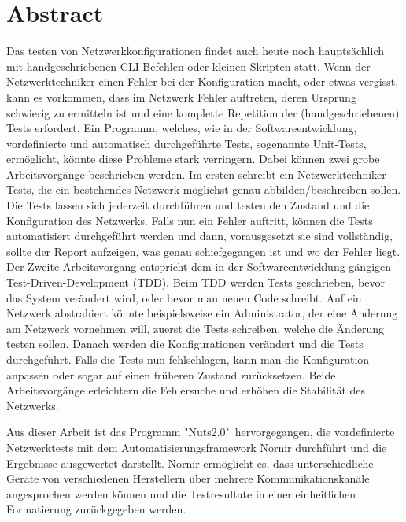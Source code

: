 \documentclass[]{subfiles}
\begin{document}
\section*{Abstract}
    Das testen von Netzwerkkonfigurationen findet auch heute noch hauptsächlich 
    mit handgeschriebenen CLI-Befehlen oder kleinen Skripten statt. 
    Wenn der Netzwerktechniker einen Fehler bei der Konfiguration macht, 
    oder etwas vergisst, kann es vorkommen, dass im Netzwerk Fehler auftreten, 
    deren Ursprung schwierig zu ermitteln ist und eine komplette Repetition der 
    (handgeschriebenen) Tests erfordert.
    Ein Programm, welches, wie in der Softwareentwicklung, vordefinierte und automatisch 
    durchgeführte Tests, sogenannte Unit-Tests, ermöglicht, könnte diese Probleme stark
    verringern. Dabei können zwei grobe Arbeitsvorgänge beschrieben werden. 
    Im ersten schreibt ein Netzwerktechniker Tests, die ein bestehendes Netzwerk 
    möglichst genau abbilden/beschreiben sollen. 
    Die Tests lassen sich jederzeit durchführen und testen den Zustand und die 
    Konfiguration des Netzwerks. 
    Falls nun ein Fehler auftritt, können die Tests automatisiert durchgeführt 
    werden und dann, vorausgesetzt sie sind vollständig, sollte der Report aufzeigen, 
    was genau schiefgegangen ist und wo der Fehler liegt. 
    Der Zweite Arbeitsvorgang entspricht dem in der Softwareentwicklung gängigen 
    Test-Driven-Development (TDD). 
    Beim TDD werden Tests geschrieben, bevor das System verändert wird, oder bevor 
    man neuen Code schreibt. 
    Auf ein Netzwerk abstrahiert könnte beispielsweise ein Administrator, der 
    eine Änderung am Netzwerk vornehmen will, zuerst die Tests schreiben, 
    welche die Änderung testen sollen. 
    Danach werden die Konfigurationen verändert und die Tests durchgeführt. 
    Falls die Tests nun fehlschlagen, kann man die Konfiguration anpassen oder 
    sogar auf einen früheren Zustand zurücksetzen. 
    Beide Arbeitsvorgänge erleichtern die Fehlersuche und erhöhen die Stabilität des Netzwerks.

    Aus dieser Arbeit ist das Programm "Nuts2.0"\, hervorgegangen, die vordefinierte
    Netzwerktests mit dem Automatisierungsframework Nornir durchführt und die 
    Ergebnisse ausgewertet darstellt. 
    Nornir ermöglicht es, dass unterschiedliche Geräte von verschiedenen Herstellern
    über mehrere Kommunikationskanäle angesprochen werden können und die Testresultate
    in einer einheitlichen Formatierung zurückgegeben werden.
\end{document}
